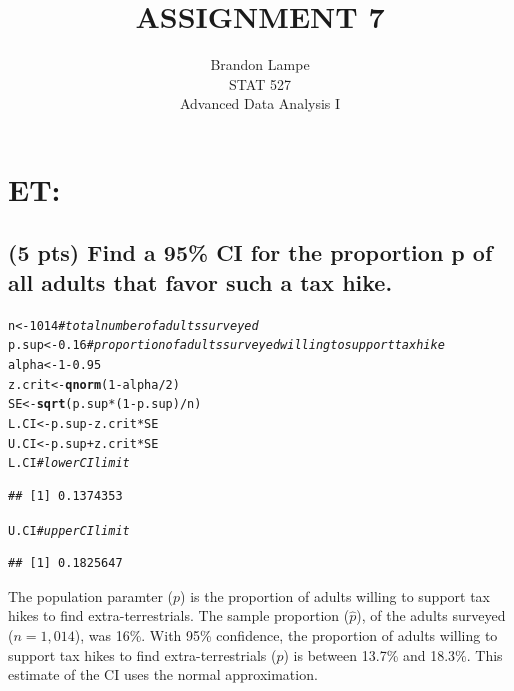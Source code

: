 \documentclass{article}\usepackage[]{graphicx}\usepackage[]{color}
\makeatletter
\newcommand{\hlnum}[1]{\textcolor[rgb]{0.686,0.059,0.569}{#1}}%
\newcommand{\hlcom}[1]{\textcolor[rgb]{0.678,0.584,0.686}{\textit{#1}}}%
\newcommand{\hlopt}[1]{\textcolor[rgb]{0,0,0}{#1}}%
\newcommand{\hlstd}[1]{\textcolor[rgb]{0.345,0.345,0.345}{#1}}%
\newcommand{\hlkwb}[1]{\textcolor[rgb]{0.69,0.353,0.396}{#1}}%
\newcommand{\hlkwd}[1]{\textcolor[rgb]{0.737,0.353,0.396}{\textbf{#1}}}%
\newenvironment{kframe}{%
 \def\at@end@of@kframe{}%
 \ifinner\ifhmode%
  \def\at@end@of@kframe{\end{minipage}}%
  \begin{minipage}{\columnwidth}%
 \fi\fi%
 \def\FrameCommand##1{\hskip\@totalleftmargin \hskip-\fboxsep
 \colorbox{shadecolor}{##1}\hskip-\fboxsep
     \hskip-\linewidth \hskip-\@totalleftmargin \hskip\columnwidth}%
 \MakeFramed {\advance\hsize-\width
   \@totalleftmargin\z@ \linewidth\hsize
   \@setminipage}}%
 {\par\unskip\endMakeFramed%
 \at@end@of@kframe}
\newenvironment{knitrout}{}{} %
\makeatother
\begin{document}
\title{ASSIGNMENT 7}
\author{Brandon Lampe \\ STAT 527 \\ Advanced Data Analysis I}
\maketitle



\section{ET:}
\subsection{(5 pts) Find a 95\% CI for the proportion p of all adults that favor such a tax hike.}

\begin{knitrout}
\color{fgcolor}\begin{kframe}
\begin{alltt}
\hlstd{n} \hlkwb{<-} \hlnum{1014}         \hlcom{# total number of adults surveyed}
\hlstd{p.sup} \hlkwb{<-} \hlnum{0.16}     \hlcom{# proportion of adults surveyed willing to support tax hike}
\hlstd{alpha} \hlkwb{<-} \hlnum{1} \hlopt{-} \hlnum{0.95}
\hlstd{z.crit} \hlkwb{<-} \hlkwd{qnorm}\hlstd{(}\hlnum{1} \hlopt{-} \hlstd{alpha}\hlopt{/}\hlnum{2}\hlstd{)}
\hlstd{SE} \hlkwb{<-} \hlkwd{sqrt}\hlstd{(p.sup}\hlopt{*}\hlstd{(}\hlnum{1} \hlopt{-} \hlstd{p.sup)}\hlopt{/}\hlstd{n)}
\hlstd{L.CI} \hlkwb{<-} \hlstd{p.sup} \hlopt{-} \hlstd{z.crit} \hlopt{*} \hlstd{SE}
\hlstd{U.CI} \hlkwb{<-} \hlstd{p.sup} \hlopt{+} \hlstd{z.crit} \hlopt{*} \hlstd{SE}
\hlstd{L.CI} \hlcom{# lower CI limit}
\end{alltt}
\begin{verbatim}
## [1] 0.1374353
\end{verbatim}
\begin{alltt}
\hlstd{U.CI} \hlcom{# upper CI limit}
\end{alltt}
\begin{verbatim}
## [1] 0.1825647
\end{verbatim}
\end{kframe}
\end{knitrout}

The population paramter ($p$) is the proportion of adults willing to support tax hikes to find extra-terrestrials.  The sample proportion ($\hat{p}$), of the adults surveyed ($n = 1,014$), was 16\%.  With 95\% confidence, the proportion of adults willing to support tax hikes to find extra-terrestrials ($p$) is between 13.7\% and 18.3\%.  This estimate of the CI uses the normal approximation.
\end{document}

